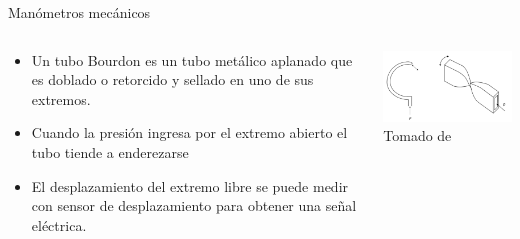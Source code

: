 \documentclass[aspectratio=169]{beamer}
\begin{document}
\begin{frame}{Manómetros mecánicos}
    \begin{columns}[c, onlytextwidth]
        \begin{column}{0.5\textwidth}
            \begin{itemize}
                \item Un tubo Bourdon es un tubo metálico aplanado que es doblado o retorcido y sellado en uno de sus extremos. 
                \item Cuando la presión ingresa por el extremo abierto el tubo tiende a enderezarse 
                \item El desplazamiento del extremo libre se puede medir con sensor de desplazamiento para obtener una señal eléctrica.
            \end{itemize}
        \end{column}
        \begin{column}{0.5\textwidth}
            \centering
            \includegraphics[width=7cm]{fig/Presion/bourdon.PNG}
             \\ \tiny{Tomado de \cite{pallas2012sensors}}
        \end{column}
    \end{columns}
\end{frame}
\end{document}

